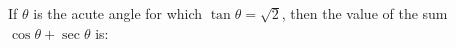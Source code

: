 \documentclass{ximera}
\author{Ivo Terek}
\begin{document}
\begin{exercise}
  If $\theta$ is the acute angle for which $\tan\theta=\sqrt{2}$, then the value of the sum $\cos\theta+\sec\theta$ is:
  \begin{multipleChoice}
  \end{multipleChoice}
\end{exercise}
\end{document}

